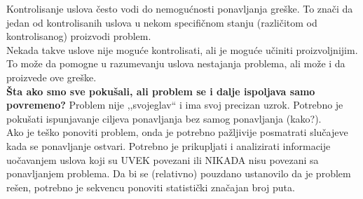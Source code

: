 \documentclass[a4paper]{article}
\begin{document}
  Kontrolisanje uslova često vodi do nemogućnosti ponavljanja greške. To znači da jedan od kontrolisanih
  uslova u nekom specifičnom stanju (različitom od kontrolisanog) proizvodi problem.\\
  \indent Nekada takve uslove nije moguće kontrolisati, ali je moguće učiniti proizvoljnijim. To
  može da pomogne u razumevanju uslova nestajanja problema, ali može i da proizvede ove greške.\\
  
  \textbf{Šta ako smo sve pokušali, ali problem se i dalje ispoljava samo povremeno?} Problem
  nije ,,svojeglav`` i ima svoj precizan uzrok. Potrebno je pokušati ispunjavanje ciljeva ponavljanja
  bez samog ponavljanja (kako?). \\
  \indent Ako je teško ponoviti problem, onda je potrebno pažljivije posmatrati slučajeve
  kada se ponavljanje ostvari. Potrebno je prikupljati i analizirati informacije uočavanjem
  uslova koji su UVEK povezani ili NIKADA nisu povezani sa ponavljanjem problema. Da bi se
  (relativno) pouzdano ustanovilo da je problem rešen, potrebno je sekvencu ponoviti statistički
  značajan broj puta.
\end{document}
